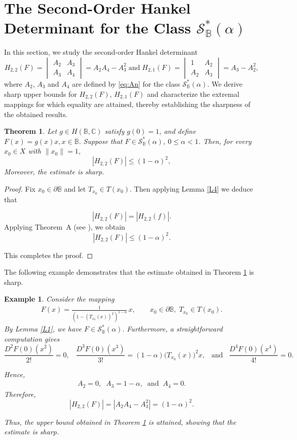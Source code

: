 \documentclass[11pt, reqno]{amsart}
\newtheorem{theo}{Theorem}[section]
\newtheorem{exm}{Example}[section]
\numberwithin{equation}{section}
\newcommand{\bea}{\begin{eqnarray}}
\newcommand{\eea}{\end{eqnarray}}
\begin{document}
\section{\texorpdfstring{\bf The Second-Order Hankel Determinant for the Class $\mathcal{S}^*_\mathbb{B}(\alpha)$}{The Second-Order Hankel Determinant}}

In this section, we study the second-order Hankel determinant
\[
H_{2,2}(F)=\begin{vmatrix}
A_2 &A_3\\
 A_3 & A_4 
\end{vmatrix}=A_2A_4-A_3^2\;\text{and}\; H_{2,1}(F)=\begin{vmatrix}
1 &A_2\\
 A_2 & A_3 
\end{vmatrix}=A_3-A_2^2,
\] where $A_2$, $A_3$ and $A_4$ are defined by
\eqref{eq:An} for the class $\mathcal{S}^*_\mathbb{B}(\alpha)$. We derive sharp upper bounds for $H_{2,2}(F)$, $H_{2,1}(F)$  and characterize the extremal mappings for which equality are attained, thereby establishing the sharpness of the obtained results.
\begin{theo}\label{T1}
Let $g\in H(\mathbb{B},\mathbb{C})$ satisfy $g(0)=1$, and define $F(x)=g(x)x, x\in\mathbb{B}.$
Suppose that $F\in\mathcal{S}^*_\mathbb{B}(\alpha)$, $0\leq \alpha <1$. Then, for every
$x_{0}\in X$ with $\|x_{0}\|=1$,
\[
|H_{2,2}(F)|\leq (1-\alpha)^2,
\]
 Moreover, the estimate is sharp.
\end{theo}

\begin{proof}
 Fix $x_0\in \partial{\mathbb{B}}$ and let $T_{x_0}\in T(x_0)$. Then applying Lemma \ref{L4} we deduce that

\[
|H_{2,2}(F)|
=
|H_{2,2}(f)|.
\]
Applying Theorem~A (see \cite[Theorem 2.3]{CKKLS2018}),
we obtain
\[
|H_{2,2}(F)| \leq (1-\alpha)^2.\]

This completes the proof.
\end{proof}

The following example demonstrates that the estimate obtained in Theorem \ref{T1} is sharp.

\begin{exm}
Consider the mapping
\bea\label{ex1}
F(x)=
\frac{1}{\left(1-(T_{x_0}(x))^2\right)^{1-\alpha}}\,x,
\qquad
x_0\in\partial\mathbb{B},\;
T_{x_0}\in T(x_0).
\eea
By Lemma \ref{L1}, we have $F\in\mathcal{S}^*_\mathbb{B}(\alpha).$
Furthermore, a straightforward computation gives
\[
\frac{D^2F(0)(x^2)}{2!}=0,\;\;\;
\frac{D^3F(0)(x^3)}{3!}
=
(1-\alpha)
\bigl(T_{x_0}(x)\bigr)^2x,
\;\;\;\text{and}\;\;\;
\frac{D^4F(0)(x^4)}{4!}=0.
\]

Hence,
\bea\label{Q1}
A_2=0,\;\;
A_3=1-\alpha,\;\;\text{and}\;\;
A_4=0.
\eea
Therefore,
\[
|H_{2,2}(F)|
=
\left|A_2A_4-A_3^2\right|
=
(1-\alpha)^2.
\]

Thus, the upper bound obtained in Theorem \ref{T1} is attained, showing that the estimate is sharp.
\end{exm}
\end{document}
